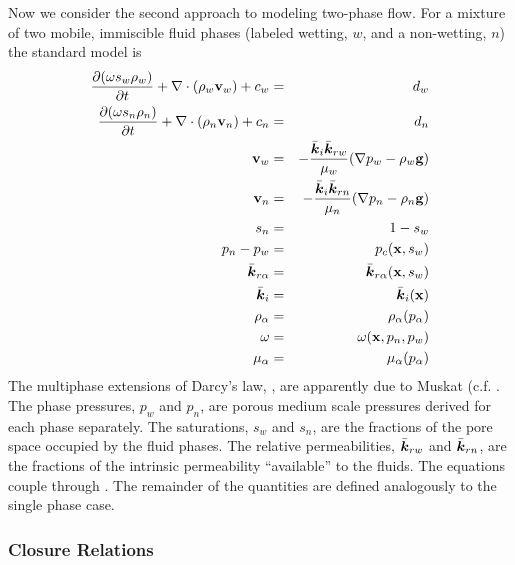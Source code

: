 \documentclass[10pt,dvips,twoside,reqno]{amsart}
\begin{document}
Now we consider the second approach to modeling two-phase flow. For a
mixture of two mobile, immiscible fluid phases (labeled wetting, $w$,
and a non-wetting, $n$) the standard model is
\begin{eqnarray}
\frac{\partial {(\omega s_w \rho_w)}}{\partial {t}} + \nabla \cdot (\rho_w {\bf v}_w) +c_w&=& d_w \label{eq:satW} \\
\frac{\partial {(\omega s_n \rho_n)}}{\partial {t}} + \nabla \cdot (\rho_n {\bf v}_n) +c_n&=& d_n \label{eq:satN}\\
{\bf v}_w &=& - \frac{\bar{\mbox{{\boldmath ${k}$}}}_i \bar{\mbox{{\boldmath ${k}$}}}_{rw}}{\mu_w}(\nabla p_w - \rho_w {\bf g})  \label{eq:waterFlux} \\
{\bf v}_n &=& - \frac{\bar{\mbox{{\boldmath ${k}$}}}_i \bar{\mbox{{\boldmath ${k}$}}}_{rn}}{\mu_n}(\nabla p_n - \rho_n {\bf g})  \label{eq:nwFlux}\\
s_n &=& 1 - s_w \label{eq:sat_const} \\
p_n - p_w &=& p_c({\bf x},s_w) \label{eq:pc_S} \\
\bar{\mbox{{\boldmath ${k}$}}}_{r \alpha} &=& \bar{\mbox{{\boldmath ${k}$}}}_{r \alpha}({\bf x},s_w) \label{eq:kr_S} \\
\bar{\mbox{{\boldmath ${k}$}}}_{i} &=& \bar{\mbox{{\boldmath ${k}$}}}_{i}({\bf x}) \\
\rho_{\alpha} &=& \rho_{\alpha}(p_{\alpha}) \\
\omega &=& \omega({\bf x},p_n,p_w) \\
\mu_{\alpha} &=& \mu_{\alpha}(p_{\alpha})
\label{eq:viscosity} 
\end{eqnarray}
The multiphase extensions of Darcy's law, ,
are apparently due to Muskat (c.f. \citep{Chavent_Jaffre_86}.  The
phase pressures, $p_w$ and $p_n$, are porous medium scale pressures
derived for each phase separately. The saturations, $s_w$ and $s_n$,
are the fractions of the pore space occupied by the fluid phases. The
relative permeabilities, $\bar{\mbox{{\boldmath ${k}$}}}_{rw}$ and $\bar{\mbox{{\boldmath ${k}$}}}_{rn}$, are the
fractions of the intrinsic permeability ``available'' to the fluids.
The equations couple through . The remainder of
the quantities are defined analogously to the single phase case.

\subsubsection{Closure Relations}
\end{document}
